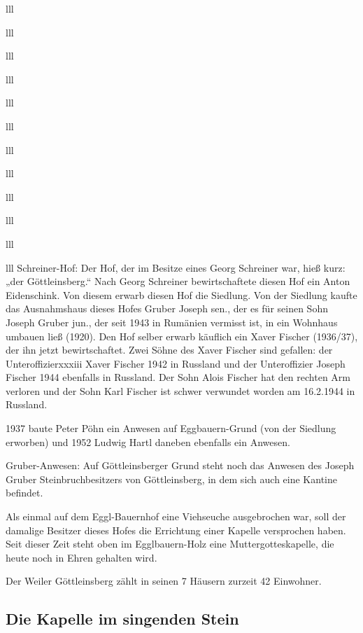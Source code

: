 \documentclass[12pt,a4pager]{book}
\begin{document}
\begin{tabuluar}{lll}
\begin{tabuluar}{lll}
\begin{tabuluar}{lll}
\begin{tabuluar}{lll}
\begin{tabuluar}{lll}
\begin{tabuluar}{lll}
\begin{tabuluar}{lll}
\begin{tabuluar}{lll}
\begin{tabuluar}{lll}
\begin{tabuluar}{lll}
\begin{tabuluar}{lll}
\begin{tabuluar}{lll}
Schreiner-Hof: Der Hof, der im Besitze eines Georg Schreiner war, hieß kurz:
„der Göttleinsberg.“ Nach Georg Schreiner bewirtschaftete diesen Hof ein Anton
Eidenschink. Von diesem erwarb diesen Hof die Siedlung. Von der Siedlung kaufte
das Ausnahmshaus dieses Hofes Gruber Joseph sen., der es für seinen Sohn Joseph
Gruber jun., der seit 1943 in Rumänien vermisst ist, in ein Wohnhaus umbauen
ließ (1920). Den Hof selber erwarb käuflich ein Xaver Fischer (1936/37), der ihn
jetzt bewirtschaftet. Zwei Söhne des Xaver Fischer sind gefallen: der
Unteroffizierxxxiii Xaver Fischer 1942 in Russland und der Unteroffizier Joseph
Fischer 1944 ebenfalls in Russland. Der Sohn Alois Fischer hat den rechten Arm
verloren und der Sohn Karl Fischer ist schwer verwundet worden am 16.2.1944 in
Russland.

1937 baute Peter Pöhn ein Anwesen auf Eggbauern-Grund (von der Siedlung
erworben) und 1952 Ludwig Hartl daneben ebenfalls ein Anwesen.

Gruber-Anwesen: Auf Göttleinsberger Grund steht noch das Anwesen des Joseph
Gruber Steinbruchbesitzers von Göttleinsberg, in dem sich auch eine Kantine
befindet.

Als einmal auf dem Eggl-Bauernhof eine Viehseuche ausgebrochen war, soll der
damalige Besitzer dieses Hofes die Errichtung einer Kapelle versprochen haben.
Seit dieser Zeit steht oben im Egglbauern-Holz eine Muttergotteskapelle, die
heute noch in Ehren gehalten wird.

Der Weiler Göttleinsberg zählt in seinen 7 Häusern zurzeit 42 Einwohner.

\subsection{Die Kapelle im singenden Stein}


\end{tabuluar}
\end{tabuluar}
\end{tabuluar}
\end{tabuluar}
\end{tabuluar}
\end{tabuluar}
\end{tabuluar}
\end{tabuluar}
\end{tabuluar}
\end{tabuluar}
\end{tabuluar}
\end{tabuluar}
\end{document}
